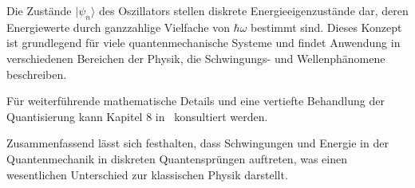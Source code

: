 	Die Zustände $|\psi_n\rangle$ des Oszillators stellen diskrete Energieeigenzustände dar, deren Energiewerte durch ganzzahlige Vielfache von $\hbar \omega$ bestimmt sind.
	Dieses Konzept ist grundlegend für viele quantenmechanische Systeme und findet Anwendung in verschiedenen Bereichen der Physik, die Schwingungs- und Wellenphänomene beschreiben.

	Für weiterführende mathematische Details und eine vertiefte Behandlung der Quantisierung kann Kapitel 8 in~\cite{fourier:quantenmechanik} konsultiert werden.

	Zusammenfassend lässt sich festhalten, dass Schwingungen und Energie in der Quantenmechanik in diskreten Quantensprüngen auftreten, was einen wesentlichen Unterschied zur klassischen Physik darstellt.
